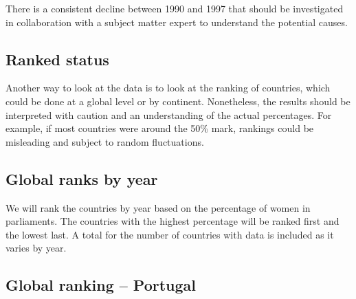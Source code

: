 \documentclass[a4paper,9pt,twocolumn,twoside,printwatermark=false]{pinp}
\begin{document}
There is a consistent decline between 1990 and 1997 that should be
investigated in collaboration with a subject matter expert to understand
the potential causes.

\subsection{Ranked status}\label{ranked-status}

Another way to look at the data is to look at the ranking of countries,
which could be done at a global level or by continent. Nonetheless, the
results should be interpreted with caution and an understanding of the
actual percentages. For example, if most countries were around the 50\%
mark, rankings could be misleading and subject to random fluctuations.

\subsection{Global ranks by year}\label{global-ranks-by-year}

We will rank the countries by year based on the percentage of women in
parliaments. The countries with the highest percentage will be ranked
first and the lowest last. A total for the number of countries with data
is included as it varies by year.

\begin{Shaded}
\end{Shaded}

\subsection{Global ranking -- Portugal}\label{global-ranking-portugal}
\end{document}
